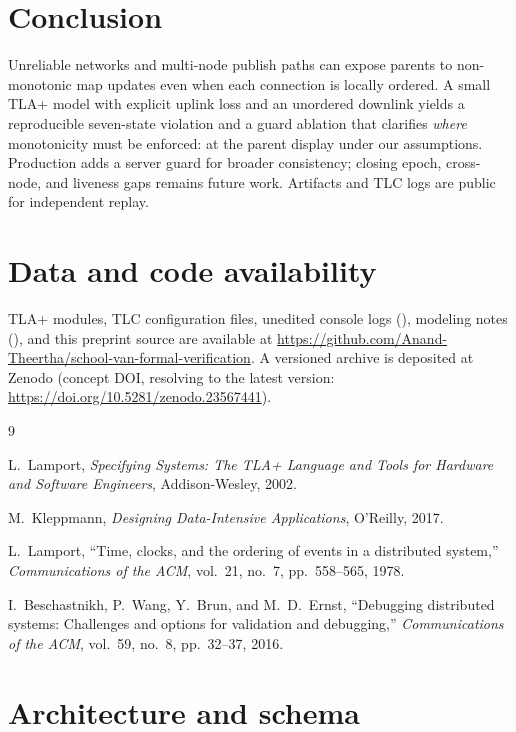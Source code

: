 \documentclass[11pt,a4paper]{article}
\begin{document}
\section{Conclusion}
\label{sec:conclusion}

Unreliable networks and multi-node publish paths can expose parents to non-monotonic map updates even when each connection is locally ordered. A small TLA+ model with explicit uplink loss and an unordered downlink yields a reproducible seven-state violation and a guard ablation that clarifies \emph{where} monotonicity must be enforced: at the parent display under our assumptions. Production adds a server guard for broader consistency; closing epoch, cross-node, and liveness gaps remains future work. Artifacts and TLC logs are public for independent replay.

\section*{Data and code availability}

TLA+ modules, TLC configuration files, unedited console logs (), modeling notes (), and this preprint source are available at \url{https://github.com/Anand-Theertha/school-van-formal-verification}. A versioned archive is deposited at Zenodo (concept DOI, resolving to the latest version: \url{https://doi.org/10.5281/zenodo.23567441}).

\begin{thebibliography}{9}

L.~Lamport,
\emph{Specifying Systems: The TLA+ Language and Tools for Hardware and Software Engineers},
Addison-Wesley, 2002.

M.~Kleppmann,
\emph{Designing Data-Intensive Applications},
O'Reilly, 2017.

L.~Lamport,
``Time, clocks, and the ordering of events in a distributed system,''
\emph{Communications of the ACM}, vol.~21, no.~7, pp.~558--565, 1978.

I.~Beschastnikh, P.~Wang, Y.~Brun, and M.~D.~Ernst,
``Debugging distributed systems: Challenges and options for validation and debugging,''
\emph{Communications of the ACM}, vol.~59, no.~8, pp.~32--37, 2016.

\end{thebibliography}

\appendix

\section{Architecture and schema}
\label{app:arch}
\end{document}
